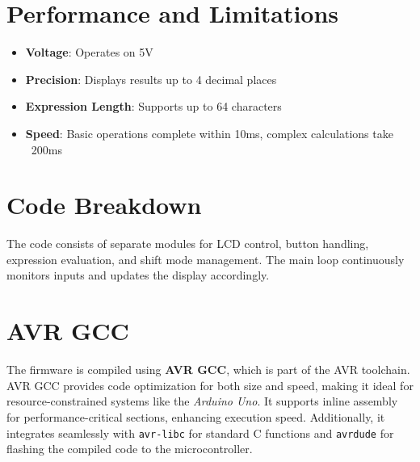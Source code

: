 \documentclass{article}
\theoremstyle{remark}
\begin{document}
\section{Performance and Limitations}
\begin{itemize}[noitemsep]
    \item \textbf{Voltage}: Operates on 5V
    \item \textbf{Precision}: Displays results up to 4 decimal places
    \item \textbf{Expression Length}: Supports up to 64 characters
    \item \textbf{Speed}: Basic operations complete within 10ms, complex calculations take ~200ms
\end{itemize}

\section{Code Breakdown}
The code consists of separate modules for LCD control, button handling, expression evaluation, and shift mode management. The main loop continuously monitors inputs and updates the display accordingly.

\section{AVR GCC}
The firmware is compiled using \textbf{AVR GCC}, which is part of the AVR toolchain. AVR GCC provides code optimization for both size and speed, making it ideal for resource-constrained systems like the \textit{Arduino Uno}. It supports inline assembly for performance-critical sections, enhancing execution speed. Additionally, it integrates seamlessly with \texttt{avr-libc} for standard C functions and \texttt{avrdude} for flashing the compiled code to the microcontroller.
\end{document}
